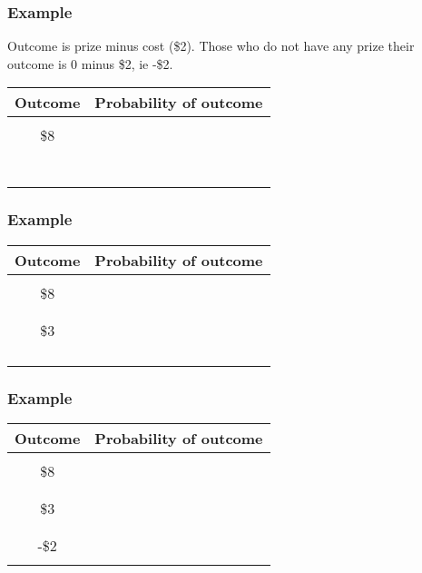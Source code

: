 \begin{frame}
\frametitle{Example}
Outcome is prize minus cost (\$2). Those who do not have any prize their outcome is 0 minus \$2, ie -\$2.
\begin{center}
\begin{tabular}{|c|c|}
\hline
Outcome	&Probability of outcome\\
\hline
&\\
\$8  &  \\
&\\
\hline
&\\
&  \\
&\\
\hline
&\\
&\\
&\\
\hline
\end{tabular} 
\end{center}
\end{frame}

\begin{frame}
\frametitle{Example}
\begin{center}
\begin{tabular}{|c|c|}
\hline
Outcome	&Probability of outcome\\
\hline
&\\
\$8  &  \\
&\\
\hline
&\\
\$3&  \\
&\\
\hline
&\\
&\\
&\\
\hline
\end{tabular} 
\end{center}
\end{frame}

\begin{frame}
\frametitle{Example}
\begin{center}
\begin{tabular}{|c|c|}
\hline
Outcome	&Probability of outcome\\
\hline
&\\
\$8  &  \\
&\\
\hline
&\\
\$3&  \\
&\\
\hline
&\\
-\$2&\\
&\\
\hline
\end{tabular} 
\end{center}
\end{frame}

